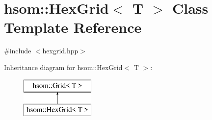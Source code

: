 \hypertarget{classhsom_1_1_hex_grid}{\section{hsom\-:\-:\-Hex\-Grid$<$ \-T $>$ \-Class \-Template \-Reference}
\label{classhsom_1_1_hex_grid}
}


{\ttfamily \#include $<$hexgrid.\-hpp$>$}

\-Inheritance diagram for hsom\-:\-:\-Hex\-Grid$<$ \-T $>$\-:\begin{figure}[H]
\begin{center}
\leavevmode
\includegraphics[height=2.000000cm]{classhsom_1_1_hex_grid}
\end{center}
\end{figure}
